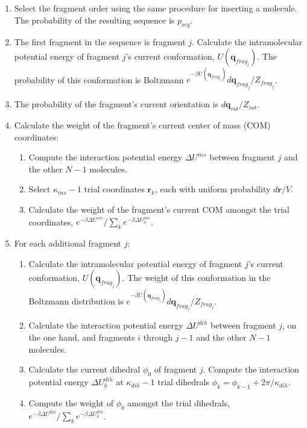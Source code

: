 \begin{enumerate}
  \item Select the fragment order using the same procedure for inserting a molecule. The probability of the resulting sequence is $p_{seq}$.
	\item The first fragment in the sequence is fragment $j$. Calculate the intramolecular potential energy of fragment $j$'s current conformation, $U(\mathbf{q}_{frag_j})$. The probability of this conformation is Boltzmann  $e^{-\beta U(\mathbf{q}_{frag_j})}d\mathbf{q}_{frag_j}/Z_{frag_j}$.
	\item The probability of the fragment's current orientation is $d\mathbf{q}_{rot}/Z_{rot}$. 
	\item Calculate the weight of the fragment's current center of mass (COM) coordinates:
	\begin{enumerate}
		\item Compute the interaction potential energy $\Delta U^{ins}$ between fragment $j$ and the other $N-1$ molecules.
		\item Select $\kappa_{ins}-1$ trial coordinates $\mathbf{r}_k$, each with uniform probability $d\mathbf{r}/V$.
		\item Calculate the weight of the fragment's current COM amongst the trial coordinates, $e^{-\beta \Delta U^{ins}} / \sum_k{e^{-\beta \Delta U_k^{ins}}}$.
	\end{enumerate}
	\item For each additional fragment $j$:
	\begin{enumerate}
		\item Calculate the intramolecular potential energy of fragment $j$'s current conformation, $U(\mathbf{q}_{frag_j})$. The weight of this conformation in the Boltzmann distribution is $e^{-\beta U(\mathbf{q}_{frag_j})}d\mathbf{q}_{frag_j}/Z_{frag_j}$.
		\item Calculate the interaction potential energy $\Delta U^{dih}$ between fragment $j$, on the one hand, and fragments $i$ through $j-1$ and the other $N-1$ molecules.
		\item Calculate the current dihedral $\phi_0$ of fragment $j$. Compute the interaction potential energy $\Delta U_k^{dih}$ at $\kappa_{dih}-1$ trial dihedrals $\phi_k = \phi_{k-1} + 2\pi/\kappa_{dih}$.
		\item Compute the weight of $\phi_0$ amongst the trial dihedrals, $e^{-\beta \Delta U^{dih}}/ \sum_k{e^{-\beta \Delta U_k^{dih}}}$.
	\end{enumerate}
\end{enumerate}

